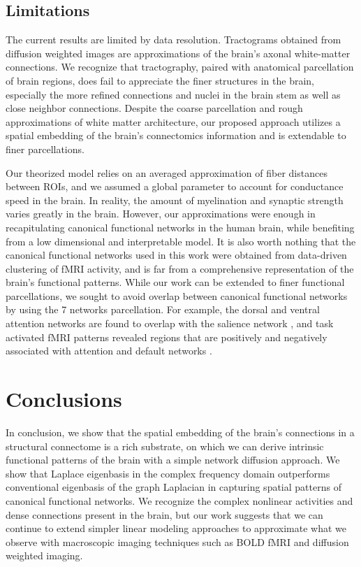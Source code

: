 \subsection{Limitations}
The current results are limited by data resolution. Tractograms obtained from diffusion weighted images are approximations of the brain's axonal white-matter connections. We recognize that tractography, paired with anatomical parcellation of brain regions, does fail to appreciate the finer structures in the brain, especially the more refined connections and nuclei in the brain stem as well as close neighbor connections. Despite the coarse parcellation and rough approximations of white matter architecture, our proposed approach utilizes a spatial embedding of the brain's connectomics information and is extendable to finer parcellations. 

Our theorized model relies on an averaged approximation of fiber distances between ROIs, and we assumed a global parameter to account for conductance speed in the brain. In reality, the amount of myelination and synaptic strength varies greatly in the brain. However, our approximations were enough in recapitulating canonical functional networks in the human brain, while benefiting from a low dimensional and interpretable model. It is also worth nothing that the canonical functional networks used in this work were obtained from data-driven clustering of fMRI activity, and is far from a comprehensive representation of the brain's functional patterns. While our work can be extended to finer functional parcellations, we sought to avoid overlap between canonical functional networks by using the 7 networks parcellation. For example, the dorsal and ventral attention networks are found to overlap with the salience network \cite{seeley_dissociable_2007}, and task activated fMRI patterns revealed regions that are positively and negatively associated with attention and default networks \cite{fox_human_2005}. 

\section{Conclusions}
In conclusion, we show that the spatial embedding of the brain's connections in a structural connectome is a rich substrate, on which we can derive intrinsic functional patterns of the brain with a simple network diffusion approach. We show that Laplace eigenbasis in the complex frequency domain outperforms conventional eigenbasis of the graph Laplacian in capturing spatial patterns of canonical functional networks. We recognize the complex nonlinear activities and dense connections present in the brain, but our work suggests that we can continue to extend simpler linear modeling approaches to approximate what we observe with macroscopic imaging techniques such as BOLD fMRI and diffusion weighted imaging. 